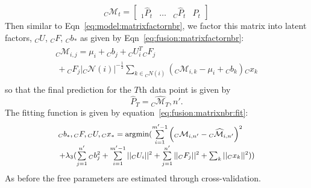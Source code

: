 \vspace{-1em}
\begin{equation}
  \label{eq:fusion:predictionmatrix}
  {}_C\mathcal{M}_{t} = \left[\begin{array}{llll}
      {}_1\widehat{P}_{t}& \dots & {}_C\widehat{P}_t & P_t 
    \end{array}
  \right]
\end{equation}
Then similar to Eqn~\ref{eq:model:matrixfactornbr}, we 
factor this matrix into latent factors, ${}_C U$, ${}_C F$, ${}_C b_*$ as 
given by Eqn~\ref{eq:fusion:matrixfactornbr}:
\begin{equation}
  \label{eq:fusion:matrixfactornbr}
  \begin{array}{l}
    {}_C \widehat{\mathcal{M}}_{i,j} =  \mu_i + {}_C b_{j} + {}_C U_i^T  {}_C F_j \\
                                \, + {}_C F_j  |{}_C \mathcal{N}(i)|^{-\frac{1}{2}}
    \sum_{k \in {}_C N(i)} ({}_C\mathcal{M}_{i,k} - \mu_i + {}_C b_{k}) {}_Cx_k \\
  \end{array}
\end{equation}
so that the final prediction for the
$T$th data point is given by
\[\widehat{P}_T = {}_C \widehat{\mathcal{M}}_T,n'.\]
The fitting function is given by equation~\ref{eq:fusion:matrixnbr:fit}:
\begin{equation}
  \small
  \label{eq:fusion:matrixnbr:fit}
  \begin{array}{l}
    {}_C b_*, {}_C F, {}_C U, {}_C x_*  = \textrm{argmin} (\sum \limits_{i=1}^{m'-1} \left({}_C \mathcal{M}_{i,n'} - {}_C \widehat{\mathcal{M}}_{i,n'}   \right)^2 \\
     \, + \lambda_3 (\sum \limits_{j=1}^{n'}{}_C b_j^2 + \sum \limits_{i=1}^{m'-1} ||{}_C U_i||^2 
     + \sum \limits_{j=1}^{n'} ||{}_C F_j||^2 + \sum_k ||{}_C x_k||^2))
  \end{array}
\end{equation}
\noindent
As before the free parameters are estimated through cross-validation.

